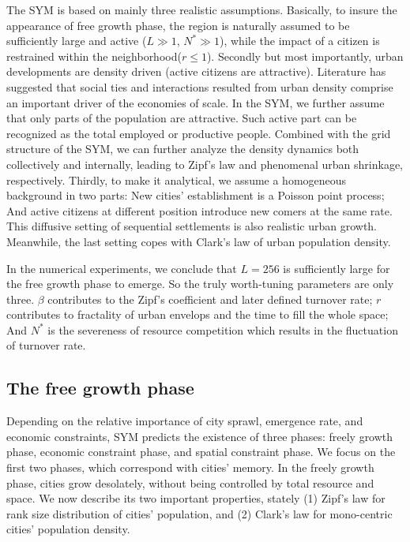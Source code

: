 \documentclass[reprint,unsortedaddress,amsmath,amssymb,aps,prl,showkeys]{revtex4-2}
\begin{document}
The SYM is based on mainly three realistic assumptions. Basically, to insure the appearance of free growth phase, the region is naturally assumed to be sufficiently large and active ($L\gg 1$, $N^*\gg 1$), while the impact of a citizen is restrained within the neighborhood($r\le 1$). Secondly but most importantly, urban developments are density driven (active citizens are attractive). Literature has suggested that social ties and interactions resulted from urban density comprise an important driver of the economies of scale\cite{pan2013urban, girardin2009quantifying, batty1992form}. In the SYM, we further assume that only parts of the population are attractive. Such active part can be recognized as the total employed or productive people. Combined with the grid structure of the SYM, we can further analyze the density dynamics both collectively and internally, leading to Zipf's law and phenomenal urban shrinkage, respectively. Thirdly, to make it analytical, we assume a homogeneous background in two parts: New cities' establishment is a Poisson point process\cite{miles1970homogeneous}; And active citizens at different position introduce new comers at the same rate. This diffusive setting of sequential settlements is also realistic urban growth\cite{RevModPhys.87.925}. Meanwhile, the last setting copes with Clark's law of urban population density\cite{clark1951urban}.

In the numerical experiments, we conclude that $L = 256$ is sufficiently large for the free growth phase to emerge. So the truly worth-tuning parameters are only three. $\beta$ contributes to the Zipf's coefficient and later defined turnover rate\cite{rooney2006structural}; $r$ contributes to fractality of urban envelops and the time to fill the whole space; And $N^*$ is the severeness of resource competition which results in the fluctuation of turnover rate.

\subsection{The free growth phase}

Depending on the relative importance of city sprawl, emergence rate, and economic constraints, SYM predicts the existence of three phases: freely growth phase, economic constraint phase, and spatial constraint phase. We focus on the first two phases, which correspond with cities' memory. In the freely growth phase, cities grow desolately, without being controlled by total resource and space. We now describe its two important properties, stately (1) Zipf's law\cite{gabaix1999zipf's} for rank size distribution of cities' population, and (2) Clark's law for mono-centric cities' population density. 
\end{document}
